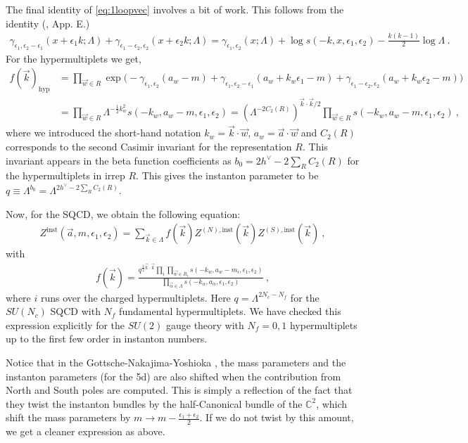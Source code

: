 \documentclass[11pt]{article}
\newcommand{\nn}{\nonumber}
\def\IC{\mathbb{C}}
\def\a{\alpha}
\def\g{\gamma}
\def\e{\epsilon}
\def\half{\frac{1}{2}}
\begin{document}
The final identity of \eqref{eq:1loopvec} involves a bit of work. This follows from the identity (\cite{Nakajima:2003uh}, App. E.)
\begin{align}
 \g_{\e_1, \e_2-\e_1}(x+\e_1 k; \Lambda) + \g_{\e_1 - \e_2, \e_2}(x+\e_2k; \Lambda)
  = \g_{\e_1, \e_2}(x; \Lambda) + \log s(-k, x, \e_1, \e_2) - \frac{k(k-1)}{2} \log \Lambda \ . 
\end{align}
For the hypermultiplets we get, 
\begin{align}
f(\vec{k})_{\textrm{hyp}} &=  \prod_{\vec{w} \in R} \exp \Big( -\g_{\e_1, \e_2} (a_w - m) + \g_{\e_1, \e_2 - \e_1}(a_w + k_w \e_1 - m) +  \g_{\e_1 - \e_2, \e_2 }(a_w + k_w \e_2 - m)   \Big) \nn \\
&= \prod_{\vec{w} \in R} \Lambda^{-\half k_w^2} s(-{k}_w, {a}_w - m, \e_1, \e_2) 
= (\Lambda^{- 2 C_2(R)})^{\vec{k} \cdot \vec{k}/2 }\prod_{\vec{w} \in R}  s(-{k}_w, {a}_w - m, \e_1, \e_2) 
\ , 
\end{align}
where we introduced the short-hand notation $k_w = \vec{k}\cdot\vec{w}$, $a_w = \vec{a} \cdot \vec{w}$ and $C_2(R)$ corresponds to the second Casimir invariant for the representation $R$. This invariant appears in the beta function coefficients as $b_0 = 2h^\vee - 2 \sum_R C_2(R)$ for the hypermultiplets in irrep $R$.  This gives the instanton parameter to be $q\equiv \Lambda^{b_0} = \Lambda^{2h^\vee - 2 \sum_R C_2(R)}$. 

Now, for the SQCD, we obtain the following equation:
\begin{align}
  Z^{\textrm{inst}}(\vec{a}, m, \e_1, \e_2) = \sum_{\vec{k} \in \Lambda} f(\vec{k}) Z^{(N), \textrm{inst}}(\vec{k} ) Z^{(S), \textrm{inst}}(\vec{k}) \ , 
\end{align}
with
\begin{align}
 f(\vec{k}) =  \frac{\displaystyle q^{\half \vec{k} \cdot \vec{k}} \prod_{i} \prod_{\vec{w} \in R_i}  s(-k_w, a_w - m_i, \e_1, \e_2)}{\displaystyle \prod_{\vec{\a} \in \Lambda} s(-k_\a, a_\a, \e_1, \e_2)} \ , 
\end{align} 
where $i$ runs over the charged hypermultiplets. Here $q = \Lambda^{2N_c - N_f}$ for the $SU(N_c)$ SQCD with $N_f$ fundamental hypermultiplets. 
We have checked this expression explicitly for the $SU(2)$ gauge theory with $N_f=0, 1$ hypermultiplets up to the first few order in instanton numbers. 

Notice that in the Gottsche-Nakajima-Yoshioka \cite{Nakajima:2009qjc, Gottsche:2010ig}, the mass parameters and the instanton parameters (for the 5d) are also shifted when the contribution from North and South poles are computed. This is simply a reflection of the fact that they twist the instanton bundles by the half-Canonical bundle of the $\IC^2$, which shift the mass parameters by $m \to m - \frac{\e_1 + \e_2}{2}$. If we do not twist by this amount, we get a cleaner expression as above. 
\end{document}

